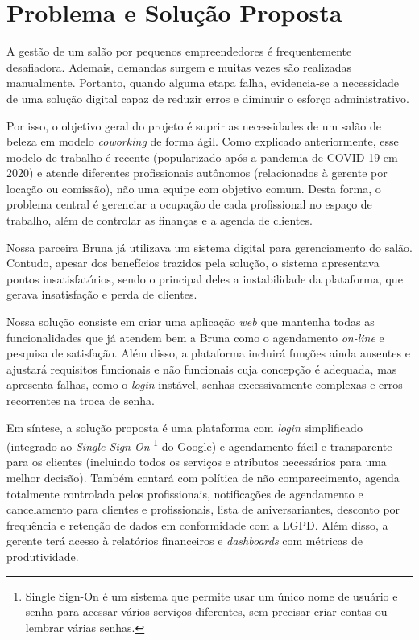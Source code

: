 \section{Problema e Solução Proposta}

A gestão de um salão por pequenos empreendedores é frequentemente desafiadora. Ademais, demandas surgem e muitas vezes são realizadas manualmente. Portanto, quando alguma etapa falha, evidencia‐se a necessidade de uma solução digital capaz de reduzir erros e diminuir o esforço administrativo.

Por isso, o objetivo geral do projeto é suprir as necessidades de um salão de beleza em modelo \emph{coworking} de forma ágil. Como explicado anteriormente, esse modelo de trabalho é recente (popularizado após a pandemia de COVID-19 em 2020) e atende diferentes profissionais autônomos (relacionados à gerente por locação ou comissão), não uma equipe com objetivo comum. Desta forma, o problema central é gerenciar a ocupação de cada profissional no espaço de trabalho, além de controlar as finanças e a agenda de clientes.

Nossa parceira Bruna já utilizava um sistema digital para gerenciamento do salão. Contudo, apesar dos benefícios trazidos pela solução, o sistema apresentava pontos insatisfatórios, sendo o principal deles a instabilidade da plataforma, que gerava insatisfação e perda de clientes.

Nossa solução consiste em criar uma aplicação \emph{web} que mantenha todas as funcionalidades que já atendem bem a Bruna como o agendamento \emph{on-line} e pesquisa de satisfação. Além disso, a plataforma incluirá funções ainda ausentes e ajustará requisitos funcionais e não funcionais cuja concepção é adequada, mas apresenta falhas, como o \emph{login} instável, senhas excessivamente complexas e erros recorrentes na troca de senha.

Em síntese, a solução proposta é uma plataforma com \emph{login} simplificado (integrado ao \emph{Single Sign-On} \footnote{Single Sign-On é um sistema que permite usar um único nome de usuário e senha para acessar vários serviços diferentes, sem precisar criar contas ou lembrar várias senhas.} do Google) e agendamento fácil e transparente para os clientes (incluindo todos os serviços e atributos necessários para uma melhor decisão). Também contará com política de não comparecimento, agenda totalmente controlada pelos profissionais, notificações de agendamento e cancelamento para clientes e profissionais, lista de aniversariantes, desconto por frequência e retenção de dados em conformidade com a LGPD. Além disso, a gerente terá acesso à relatórios financeiros e \emph{dashboards} com métricas de produtividade.

